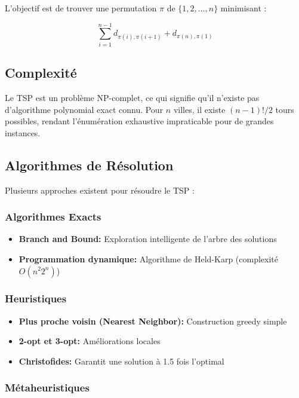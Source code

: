\documentclass[12pt,a4paper]{report}
\begin{document}
L'objectif est de trouver une permutation $\pi$ de $\{1, 2, ..., n\}$ minimisant :

\begin{equation}
    \sum_{i=1}^{n-1} d_{\pi(i), \pi(i+1)} + d_{\pi(n), \pi(1)}
\end{equation}

\subsection{Complexité}

Le TSP est un problème NP-complet, ce qui signifie qu'il n'existe pas d'algorithme polynomial exact connu. Pour $n$ villes, il existe $(n-1)!/2$ tours possibles, rendant l'énumération exhaustive impraticable pour de grandes instances.

\subsection{Algorithmes de Résolution}

Plusieurs approches existent pour résoudre le TSP :

\subsubsection{Algorithmes Exacts}

\begin{itemize}
    \item \textbf{Branch and Bound:} Exploration intelligente de l'arbre des solutions
    \item \textbf{Programmation dynamique:} Algorithme de Held-Karp (complexité $O(n^2 2^n)$)
\end{itemize}

\subsubsection{Heuristiques}

\begin{itemize}
    \item \textbf{Plus proche voisin (Nearest Neighbor):} Construction greedy simple
    \item \textbf{2-opt et 3-opt:} Améliorations locales
    \item \textbf{Christofides:} Garantit une solution à 1.5 fois l'optimal
\end{itemize}

\subsubsection{Métaheuristiques}
\end{document}

